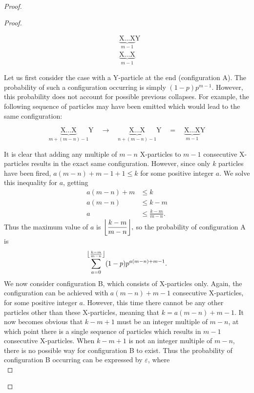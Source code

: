 \begin{proof}
\begin{proof}
    \begin{figure}[H]
      \vspace{-1.5em}
      \begin{align*}
        &\underbrace{\text{X}\dots\text{X}}_{m-1}\text{Y} \tag{A}\\
        &\underbrace{\text{X}\dots\text{X}}_{m-1} \tag{B}
      \end{align*}
      \vspace{-2em}
    \end{figure}
    Let us first consider the case with a Y-particle at the end (configuration A). The probability of such a configuration occurring is simply $(1-p)p^{m-1}$. However, this probability does not account for possible previous collapses. For example, the following sequence of particles may have been emitted which would lead to the same configuration:
    \begin{figure}[H]
      \vspace{-1.5em}
      \begin{equation*}
        \underbrace{\text{X}\dots\text{X}}_{m + (m-n) - 1}\text{Y} \quad \longrightarrow \quad \underbrace{\text{X}\dots\text{X}}_{n+(m-n)-1}\text{Y}\quad = \quad \underbrace{\text{X}\dots\text{X}}_{m-1}\text{Y} 
      \end{equation*}
      \vspace{-2em}
    \end{figure}
    It is clear that adding any multiple of $m-n$ X-particles to $m-1$ consecutive X-particles results in the exact same configuration. However, since only $k$ particles have been fired, $a(m-n) + m-1 + 1 \le k$ for some positive integer $a$. We solve this inequality for $a$, getting
    \begin{align*}
      a(m-n) + m &\le k \\
      a(m-n) &\le k - m \\
      a &\le \frac{k-m}{m-n}.
    \end{align*}
    Thus the maximum value of $a$ is $\floor*{\dfrac{k-m}{m-n}},$ so the probability of configuration A is \[
      \sum_{a=0}^{\floor*{\frac{k-m}{m-n}}} (1-p)p^{a(m-n)+m-1}
    .\]
    We now consider configuration B, which consists of X-particles only. Again, the configuration can be achieved with $a(m-n) + m-1$ consecutive X-particles, for some positive integer $a$. However, this time there cannot be any other particles other than these X-particles, meaning that  $k = a(m-n) + m-1$. It now becomes obvious that $k-m+1$ must be an integer multiple of $m-n$, at which point there is a single sequence of particles which results in $m-1$ consecutive X-particles. When $k-m+1$ is not an integer multiple of $m-n$, there is no possible way for configuration B to exist. Thus the probability of configuration B occurring can be expressed by $\varepsilon$, where \[
\]
\end{proof}
\end{proof}
